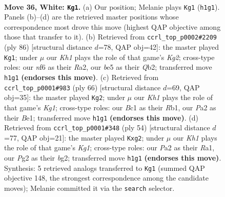 \documentclass[11pt]{article}
\begin{document}
\clearpage

\begin{figure}[p]\centering
\begin{subfigure}{0.46\textwidth}\centering
\resizebox{\linewidth}{!}{%
\newchessgame
\chessboard[
  setfen={r1b4k/ppp2pp1/5n1p/3qb3/1Q6/5P1P/PPB3P1/R1B4K w - - 12 36},
  showmover=false,
  pgfstyle=straightmove, color=movearrow, markmove={h1-g1}
]}
\caption{}
\end{subfigure}\hfill
\begin{subfigure}{0.46\textwidth}\centering
\resizebox{\linewidth}{!}{%
\newchessgame
\chessboard[
  setfen={2r3k1/5pp1/1p4b1/2n1q3/3pP1P1/5P2/RQ1BB1KP/8 w - - 2 44},
  showmover=false,
  pgfstyle=straightmove, color=movearrow, markmove={g2-g1}
]}
\caption{}
\end{subfigure}
\\[4pt]
\begin{subfigure}{0.46\textwidth}\centering
\resizebox{\linewidth}{!}{%
\newchessgame
\chessboard[
  setfen={5k2/1p3pp1/1q3n1p/2brp3/p7/P2B1QPP/1PP2P2/1R2B1K1 w - - 2 34},
  showmover=false,
  pgfstyle=straightmove, color=movearrow, markmove={g1-g2}
]}
\caption{}
\end{subfigure}\hfill
\begin{subfigure}{0.46\textwidth}\centering
\resizebox{\linewidth}{!}{%
\newchessgame
\chessboard[
  setfen={r4bk1/2Bq1pp1/p2P2np/2p5/8/PQN3NP/5Pb1/R5K1 w - - 0 28},
  showmover=false,
  pgfstyle=straightmove, color=movearrow, markmove={g1-g2}
]}
\caption{}
\end{subfigure}
\caption{\textbf{Move 36, White: \texttt{Kg1}.} (a) Our position; Melanie plays \texttt{Kg1} (\texttt{h1g1}). Panels (b)--(d) are the retrieved master positions whose correspondence most drove this move (highest QAP objective among those that transfer to it). (b) Retrieved from \texttt{ccrl\_top\_p0002\#2209} (ply 86) [structural distance $d$=78, QAP obj=42]: the master played \texttt{Kg1}; under $\mu$ our \emph{Kh1} plays the role of that game's \emph{Kg2}; cross-type roles: our \emph{n}f6 as their \emph{R}a2, our \emph{b}e5 as their \emph{Q}b2; transferred move \texttt{h1g1} \textbf{(endorses this move)}. (c) Retrieved from \texttt{ccrl\_top\_p0001\#983} (ply 66) [structural distance $d$=69, QAP obj=35]: the master played \texttt{Kg2}; under $\mu$ our \emph{Kh1} plays the role of that game's \emph{Kg1}; cross-type roles: our \emph{B}c1 as their \emph{R}b1, our \emph{P}a2 as their \emph{B}e1; transferred move \texttt{h1g1} \textbf{(endorses this move)}. (d) Retrieved from \texttt{ccrl\_top\_p0001\#348} (ply 54) [structural distance $d$=77, QAP obj=21]: the master played \texttt{Kxg2}; under $\mu$ our \emph{Kh1} plays the role of that game's \emph{Kg1}; cross-type roles: our \emph{P}a2 as their \emph{R}a1, our \emph{P}g2 as their \emph{b}g2; transferred move \texttt{h1g1} \textbf{(endorses this move)}. Synthesis: 5 retrieved analogs transferred to \texttt{Kg1} (summed QAP objective 148, the strongest correspondence among the candidate moves); Melanie committed it via the \texttt{search} selector.}
\label{fig:thought-m70}
\end{figure}
\end{document}

